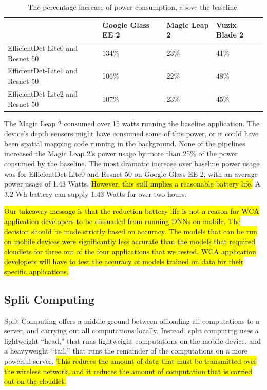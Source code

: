 \begin{table}
\begin{tabular}{|l||l|l|l|}
  \hline
  & Google Glass EE 2 & Magic Leap 2 & Vuzix Blade 2\\
  \hline
  \hline
  EfficientDet-Lite0 and Resnet 50 & 134\% & 23\% & 41\%\\
  EfficientDet-Lite1 and Resnet 50 & 106\% & 22\% & 48\%\\
  EfficientDet-Lite2 and Resnet 50 & 107\% & 23\% & 45\%\\
  \hline
\end{tabular}
  \caption{
    The percentage increase of power consumption, above the baseline.
  }\label{tab:mobile_power_pi}
\end{table}

The Magic Leap 2 consumed over 15 watts running the baseline application.
The device's depth sensors might have consumed some of this power, or it could
have been spatial mapping code running in the background.
None of the pipelines increased the Magic Leap 2's power usage by more than 25\%
of the power consumed by the baseline.
The most dramatic increase over baseline power usage was for EfficientDet-Lite0
and Resnet 50 on Google Glass EE 2, with an average power usage of 1.43 Watts.
\hl{
  However, this still implies a reasonable battery life.
}
A 3.2 Wh battery can supply 1.43 Watts for over two hours.

\hl{
  Our takeaway message is that the reduction battery life is not a reason for
  WCA application developers to be dissuaded from running DNNs on mobile.
  The decision should be made strictly based on accuracy.
  The models that can be run on mobile devices were significantly less
  accurate than the models that required cloudlets for three out of the four
  applications that we tested.
  WCA application developers will have to test the accuracy of models trained
  on data for their specific applications.
}

\subsection{Split Computing}\label{sec:split_computing}

Split Computing offers a middle ground between offloading all computations to a
server, and carrying out all computations locally.
Instead, split computing uses a lightweight ``head,'' that runs lightweight
computations on the mobile device, and a heavyweight ``tail,'' that runs the
remainder of the computations on a more powerful server.
\hl{
  This reduces the amount of data that must be transmitted over the wireless
  network, and it reduces the amount of computation that is carried out on the
  cloudlet.
}

